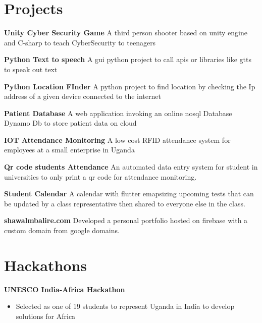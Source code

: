 \documentclass[a4paper,twocolumn]{article}
\begin{document}
        \section*{\bf Projects}

        {\bf Unity Cyber Security Game}
        A third person shooter based on unity engine and C-sharp to teach CyberSecurity to teenagers

        {\bf Python Text to speech}
        A gui python project to call apis or libraries like gtts to speak out text

        {\bf Python Location FInder}
        A python project to find location by checking the Ip address of a given device connected to the internet

        {\bf Patient Database}
        A web application invoking an online nosql Database Dynamo Db to store patient data on cloud

        {\bf IOT Attendance Monitoring}
        A low cost RFID attendance system for employees at a small enterprise in Uganda

        {\bf Qr code students Attendance}
        An automated data entry system for student in universities to only print a qr code for attendance monitoring.

        {\bf Student Calendar}
        A calendar with flutter emapsizing upcoming tests that can be updated by a class representative then shared to everyone else in the class.

        {\bf shawalmbalire.com}
        Developed a personal portfolio hosted on firebase with a custom domain from google domains.




        \section*{\bf Hackathons}

        {\bf UNESCO India-Africa Hackathon}
        \begin{itemize}[noitemsep]
            \item Selected as one of 19 students to represent Uganda in India to develop solutions for Africa
        \end{itemize}
\end{document}
